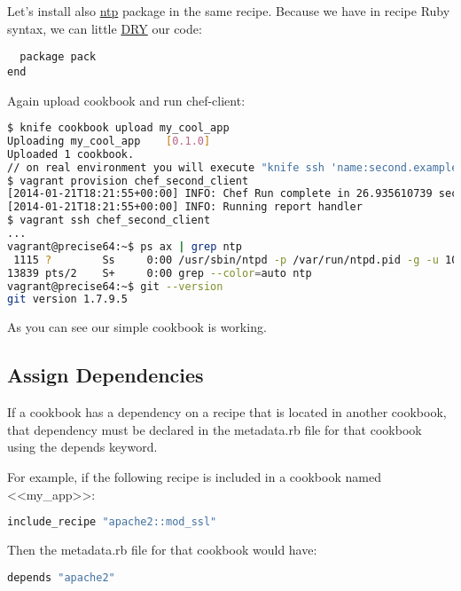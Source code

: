 Let's install also \href{http://en.wikipedia.org/wiki/Network\_Time\_Protocol}{ntp} package in the same recipe. Because we have in recipe Ruby syntax, we can little \href{http://ru.wikipedia.org/wiki/Dont\_repeat\_yourself}{DRY} our code:

\begin{lstlisting}[label=lst:cookbook-recipes4,title=my-server-cloud/site-cookbooks/my\_cool\_app/recipes/default.rb]
%w(git ntp).each do |pack|
  package pack
end
\end{lstlisting}

Again upload cookbook and run chef-client:

\begin{lstlisting}[language=Bash,label=lst:cookbook-recipes5]
$ knife cookbook upload my_cool_app
Uploading my_cool_app    [0.1.0]
Uploaded 1 cookbook.
// on real environment you will execute "knife ssh 'name:second.example.com' 'sudo chef-client' -i ../keys/production.pem -x ubuntu"
$ vagrant provision chef_second_client
[2014-01-21T18:21:55+00:00] INFO: Chef Run complete in 26.935610739 seconds
[2014-01-21T18:21:55+00:00] INFO: Running report handler
$ vagrant ssh chef_second_client
...
vagrant@precise64:~$ ps ax | grep ntp
 1115 ?        Ss     0:00 /usr/sbin/ntpd -p /var/run/ntpd.pid -g -u 103:108
13839 pts/2    S+     0:00 grep --color=auto ntp
vagrant@precise64:~$ git --version
git version 1.7.9.5
\end{lstlisting}

As you can see our simple cookbook is working.


\subsection{Assign Dependencies}

If a cookbook has a dependency on a recipe that is located in another cookbook, that dependency must be declared in the metadata.rb file for that cookbook using the depends keyword.

For example, if the following recipe is included in a cookbook named <<my\_app>>:

\begin{lstlisting}[language=Bash,label=lst:cookbook-recipes6]
include_recipe "apache2::mod_ssl"
\end{lstlisting}

Then the metadata.rb file for that cookbook would have:

\begin{lstlisting}[language=Bash,label=lst:cookbook-recipes7]
depends "apache2"
\end{lstlisting}

